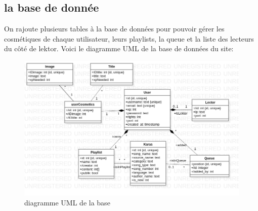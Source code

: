\subsection{la base de donnée}
On rajoute plusieurs tables à la base de données pour pouvoir gérer les cosmétiques de chaque utilisateur, leurs playlists, la queue et la liste des lecteurs du côté de lektor. Voici le diagramme UML de la base de données du site:
\newline
\begin{figure}[h!]
\centering
\hspace*{-1.2in}
\includegraphics[scale=0.6]{UML.png}
\caption{diagramme UML de la base}
\label{fig:diagramme UML}
\end{figure}
\newpage
